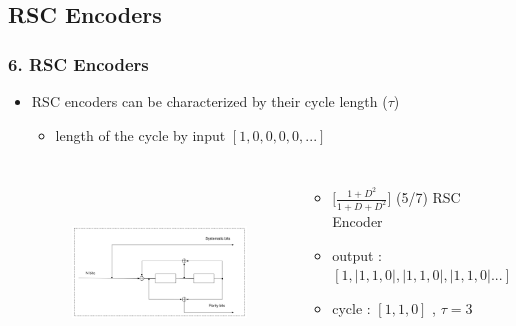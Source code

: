 \documentclass{beamer}  %
\begin{document}
\subsection{RSC Encoders}
\begin{frame}
\frametitle{6. RSC Encoders }
\begin{itemize}
\setlength\itemsep{2em}

\item  RSC encoders can be characterized by their cycle length ($\tau$) 
\begin{itemize}
\item length of the cycle by input $[1, 0, 0, 0, 0,...]$
\end{itemize}

\begin{example} 
\begin{columns}



\begin{figure}%
		\includegraphics[height = 4.5cm, width=\textwidth]{RSCExample3.pdf}
		\label{RSC}
		\end{figure}
\begin{itemize}
\item $\Big[\frac{1+D^2}{1+D+D^2}\Big]$ (5/7)  RSC Encoder
 \item output : $[1,|1,1,0|,|1,1,0|,|1,1,0|...]$ 

 \item cycle : $[1,1,0]$ , $\tau = 3$

\end{itemize}

\end{columns}
\end{example}



\end{itemize}

\end{frame}
\end{document}
